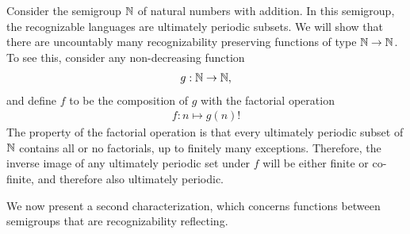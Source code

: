 \begin{example}
    Consider the semigroup ${\mathbb N}$ of natural numbers with addition. In this semigroup, the recognizable languages are ultimately periodic subsets.  We will show that there are uncountably many recognizability preserving functions of type ${\mathbb N} \to {\mathbb N}$.
    To see this, consider any  non-decreasing function 
    \begin{align*}
    g : {\mathbb N} \to {\mathbb N},
    \end{align*}
    and define $f$ to be the composition of $g$ with the factorial operation
    \begin{align*}
    f : n \mapsto g(n)!
    \end{align*}
    The property of the factorial operation is that every ultimately periodic subset of ${\mathbb N}$ contains all or no factorials, up to finitely many exceptions. Therefore, the inverse image of any ultimately periodic set under $f$ will be either finite or co-finite, and therefore also ultimately periodic.
\end{example}


We now present a second characterization, which concerns functions between semigroups that are recognizability reflecting.

